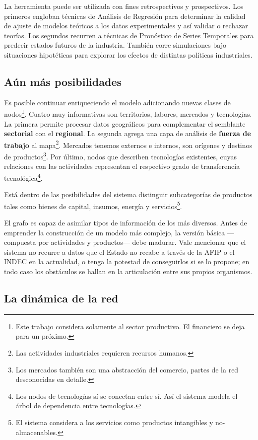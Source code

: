 \documentclass[a4paper]{report}
\begin{document}
La herramienta puede ser utilizada con fines retrospectivos y prospectivos. Los primeros engloban técnicas de Análisis de Regresión para determinar la calidad de ajuste de modelos teóricos a los datos experimentales y así validar o rechazar teorías. Los segundos recurren a técnicas de Pronóstico de Series Temporales para predecir estados futuros de la industria. También corre simulaciones bajo situaciones hipotéticas para explorar los efectos de distintas políticas industriales.

\subsection*{Aún más posibilidades}

Es posible continuar enriqueciendo el modelo adicionando nuevas clases de nodos\footnote{Este trabajo considera solamente al sector productivo. El financiero se deja para un próximo.}. Cuatro muy informativas son territorios, labores, mercados y tecnologías. La primera permite procesar datos geográficos para complementar el semblante \textbf{sectorial} con el \textbf{regional}. La segunda agrega una capa de análisis de \textbf{fuerza de trabajo} al mapa\footnote{Las actividades industriales requieren recursos humanos.}. Mercados tenemos externos e internos, son orígenes y destinos de productos\footnote{Los mercados también son una abstracción del comercio, partes de la red desconocidas en detalle.}. Por último, nodos que describen tecnologías existentes, cuyas relaciones con las actividades representan el respectivo grado de transferencia tecnológica\footnote{Los nodos de tecnologías sí se conectan entre sí. Así el sistema modela el árbol de dependencia entre tecnologías.}.

Está dentro de las posibilidades del sistema distinguir subcategorías de productos tales como bienes de capital, insumos, energía y servicios\footnote{El sistema considera a los servicios como productos intangibles y no-almacenables.}.

El grafo es capaz de asimilar tipos de información de los más diversos. Antes de emprender la construcción de un modelo más complejo, la versión básica —compuesta por actividades y productos— debe madurar. Vale mencionar que el sistema no recurre a datos que el Estado no recabe a través de la AFIP o el INDEC en la actualidad, o tenga la potestad de conseguirlos si se lo propone; en todo caso los obstáculos se hallan en la articulación entre sus propios organismos.

\subsection*{La dinámica de la red}
\end{document}
